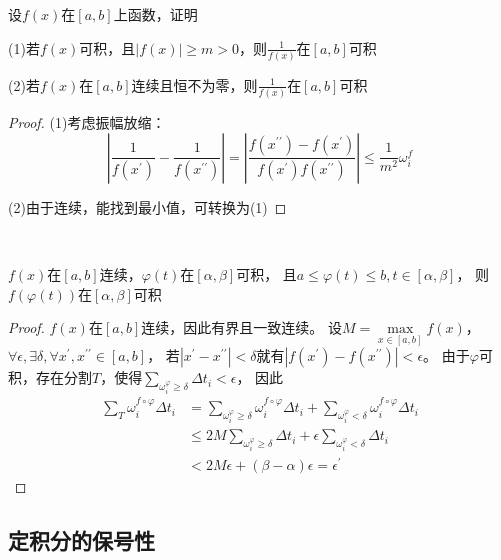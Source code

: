 \begin{exercise}[除法增加条件可积]
  设$f(x)$在$[a,b]$上函数，证明

  (1)若$f(x)$可积，且$|f(x)| \geq m > 0$，则$\frac{1}{f(x)}$在$[a,b]$可积

  (2)若$f(x)$在$[a,b]$连续且恒不为零，则$\frac{1}{f(x)}$在$[a,b]$可积
\end{exercise}

\begin{proof}
  (1)考虑振幅放缩：
  \begin{equation*}
    \left| \frac{1}{f(x^{\prime}) } - \frac{1}{f(x^{\prime\prime})} \right| = \left| \frac{f(x^{\prime\prime}) - f(x^{\prime})}{f(x^{\prime})f(x^{\prime\prime})} \right| \leq \frac{1}{m^2}\omega_i^f
  \end{equation*}

  (2)由于连续，能找到最小值，可转换为(1)
\end{proof}

~

\begin{theorem}[复合(较难，重点！)]
  $f(x)$在$[a,b]$连续，$\varphi(t)$在$[\alpha,\beta]$可积，
  且$a \leq \varphi(t) \leq b, t \in [\alpha, \beta]$，
  则$f(\varphi(t))$在$[\alpha,\beta]$可积
\end{theorem}

\begin{proof}
  $f(x)$在$[a,b]$连续，因此有界且一致连续。
  设$M = \max \limits _{x \in [a,b]}f(x)$，
  $\forall \epsilon, \exists \delta, \forall x^{\prime},x^{\prime\prime} \in [a,b]$，
  若$|x^{\prime} - x^{\prime\prime}| < \delta$就有$|f(x^{\prime} ) - f(x^{\prime\prime})| < \epsilon$。
  由于$\varphi$可积，存在分割$T$，使得$\sum\limits_{\omega_i^{\varphi} \geq \delta} \Delta t_i < \epsilon$，
  因此
  \begin{align*}
    \sum\limits_T \omega_i^{f \circ \varphi} \Delta t_i &= \sum\limits_{\omega_i^{\varphi} \geq \delta} \omega_i^{f \circ \varphi} \Delta t_i + \sum\limits_{\omega_i^{\varphi} < \delta} \omega_i^{f \circ \varphi} \Delta t_i\\
    &\leq 2M \sum\limits_{\omega_i^{\varphi} \geq \delta} \Delta t_i + \epsilon \sum\limits_{\omega_i^{\varphi} < \delta} \Delta t_i\\
    &< 2M \epsilon + (\beta - \alpha)\epsilon = \epsilon^{\prime}
  \end{align*}
\end{proof}

\subsection{定积分的保号性}

